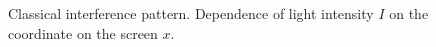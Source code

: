 \begin{figure}
\centering



\caption{Classical interference pattern. Dependence of
  light intensity $I$ on the coordinate on the screen $x$.}
\label{figPart4Ch2_3}
\end{figure}